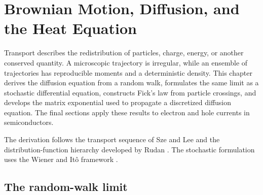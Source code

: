 \chapter{Brownian Motion, Diffusion, and the Heat Equation}
\label{ch:brownian-motion-diffusion}

Transport describes the redistribution of particles, charge, energy, or another
conserved quantity.  A microscopic trajectory is irregular, while an ensemble
of trajectories has reproducible moments and a deterministic density.
This chapter derives the diffusion equation from a random walk, formulates the
same limit as a stochastic differential equation, constructs Fick's law from
particle crossings, and develops the matrix exponential used to propagate a
discretized diffusion equation.  The final sections apply these results to
electron and hole currents in semiconductors.

The derivation follows the transport sequence of Sze and Lee
\cite[Chap.~2]{szeLee2012} and the distribution-function hierarchy developed by
Rudan \cite[Chaps.~6 and 19]{rudan2015}.  The stochastic formulation uses the
Wiener and It\^o framework \cite{wiener1923,ito1944}.

\section{The random-walk limit}

